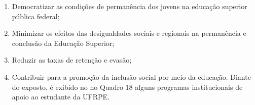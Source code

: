 \documentclass[
	12pt,				%
	openright,			%
  oneside,     %
	a4paper,			%
 hyphens,
	chapter=TITLE,		%
	english,			%
	french,				%
	spanish,			%
	brazil				%
	]{abntex2}
\begin{document}
\begin{enumerate}
    \item Democratizar as condições de permanência dos jovens na educação superior pública federal;
    \item Minimizar os efeitos das desigualdades sociais e regionais na permanência e conclusão da Educação Superior;
    \item Reduzir as taxas de retenção e evasão;
    \item Contribuir para a promoção da inclusão social por meio da educação.
	Diante do exposto, é exibido no no Quadro 18 alguns programas institucionais de apoio ao estudante da UFRPE.
\end{enumerate}

\begin{center}
  

\end{center}
\end{document}
